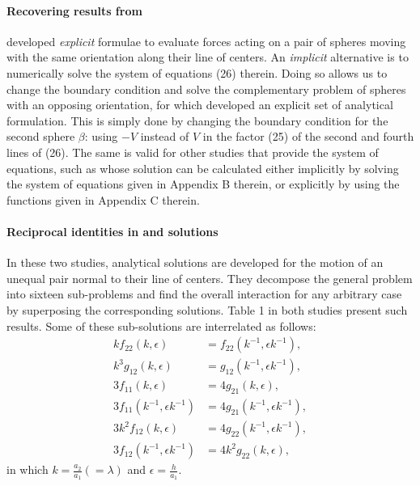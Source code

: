 \documentclass[../thesis.tex]{subfiles}
\begin{document}
\paragraph{Recovering \cite{M61} results from \cite{SJ26}}
\cite{SJ26} developed \textit{explicit} formulae to evaluate forces acting on a pair of spheres moving with the same orientation along their line of centers. An \textit{implicit} alternative is to numerically solve the system of equations (26) therein. Doing so allows us to change the boundary condition and solve the complementary problem of spheres with an opposing orientation, for which \cite{M61} developed an explicit set of analytical formulation. This is simply done by changing the boundary condition for the second sphere $\beta$: using $-V$ instead of $V$ in the factor (25) of the second and fourth lines of (26). The same is valid for other studies that provide the system of equations, such as \cite{HHS73} whose solution can be calculated either implicitly by solving the system of equations given in Appendix B therein, or explicitly by using the functions given in Appendix C therein.

\paragraph{Reciprocal identities in \cite{ONM70} and \cite{D69} solutions}
In these two studies, analytical solutions are developed for the motion of an unequal pair normal to their line of centers. They decompose the general problem into sixteen sub-problems and find the overall interaction for any arbitrary case by superposing the corresponding solutions. Table 1 in both studies present such results. Some of these sub-solutions are interrelated \cite[using the notation in][]{ONM70} as follows:
\begin{align}
k f_{22}(k, \epsilon) &= f_{22}(k^{-1}, \epsilon k^{-1}),\\
k^3 g_{12}(k, \epsilon) &= g_{12}(k^{-1}, \epsilon k^{-1}),\\
3 f_{11}(k, \epsilon) &= 4 g_{21}(k, \epsilon),\\
3 f_{11}(k^{-1}, \epsilon k^{-1}) &= 4 g_{21}(k^{-1}, \epsilon k^{-1}),\\
3k^2 f_{12}(k, \epsilon) &= 4 g_{22}(k^{-1}, \epsilon k^{-1}),\\
3 f_{12}(k^{-1}, \epsilon k^{-1}) &= 4k^2 g_{22}(k, \epsilon),
\end{align}
in which $k=\tfrac{a_2}{a_1}(=\lambda)$ and $\epsilon=\tfrac{h}{a_1}$.
\end{document}
